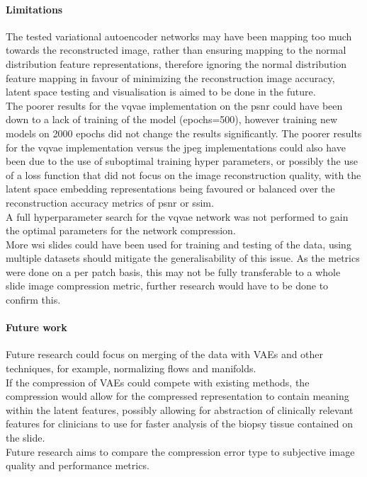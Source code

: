 \documentclass[review]{elsarticle}
\begin{document}
\paragraph{Limitations} The tested variational autoencoder networks may have been mapping too much towards the reconstructed image, rather than ensuring mapping to the normal distribution feature representations, therefore ignoring the normal distribution feature mapping in favour of minimizing the reconstruction image accuracy, latent space testing and visualisation is aimed to be done in the future. \\
The poorer results for the \gls{vqvae} implementation on the \gls{psnr} could have been down to a lack of training of the model (epochs=500), however training new models on 2000 epochs did not change the results significantly. The poorer results for the \gls{vqvae} implementation versus the \gls{jpeg} implementations could also have been due to the use of suboptimal training hyper parameters, or possibly the use of a loss function that did not focus on the image reconstruction quality, with the latent space embedding representations being favoured or balanced over the reconstruction accuracy metrics of \gls{psnr} or \gls{ssim}. \\
A full hyperparameter search for the \gls{vqvae} network was not performed to gain the optimal parameters for the network compression. \\
More \gls{wsi} slides could have been used for training and testing of the data, using multiple datasets should mitigate the generalisability of this issue. As the metrics were done on a per patch basis, this may not be fully transferable to a whole slide image compression metric, further research would have to be done to confirm this.

\paragraph{Future work} Future research could focus on merging of the data with VAEs and other techniques, for example, normalizing flows and manifolds. \\
If the compression of VAEs could compete with existing methods, the compression would allow for the compressed representation to contain meaning within the latent features, possibly allowing for abstraction of clinically relevant features for clinicians to use for faster analysis of the biopsy tissue contained on the slide. \\
Future research aims to compare the compression error type to subjective image quality and performance metrics. \\
\end{document}
